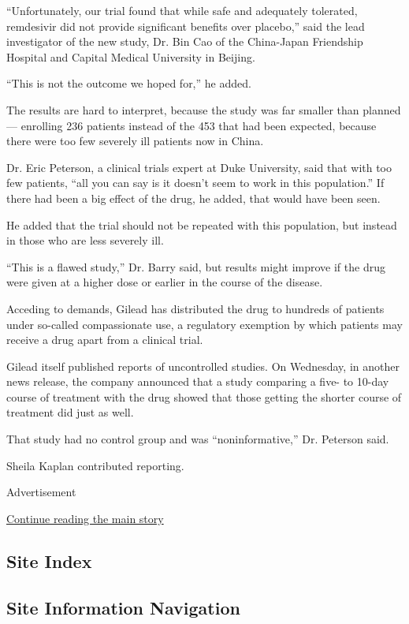 ``Unfortunately, our trial found that while safe and adequately
tolerated, remdesivir did not provide significant benefits over
placebo,'' said the lead investigator of the new study, Dr. Bin Cao of
the China-Japan Friendship Hospital and Capital Medical University in
Beijing.

``This is not the outcome we hoped for,'' he added.

The results are hard to interpret, because the study was far smaller
than planned --- enrolling 236 patients instead of the 453 that had been
expected, because there were too few severely ill patients now in China.

Dr. Eric Peterson, a clinical trials expert at Duke University, said
that with too few patients, ``all you can say is it doesn't seem to work
in this population.'' If there had been a big effect of the drug, he
added, that would have been seen.

He added that the trial should not be repeated with this population, but
instead in those who are less severely ill.

``This is a flawed study,'' Dr. Barry said, but results might improve if
the drug were given at a higher dose or earlier in the course of the
disease.

Acceding to demands, Gilead has distributed the drug to hundreds of
patients under so-called compassionate use, a regulatory exemption by
which patients may receive a drug apart from a clinical trial.

Gilead itself published reports of uncontrolled studies. On Wednesday,
in another news release, the company announced that a study comparing a
five- to 10-day course of treatment with the drug showed that those
getting the shorter course of treatment did just as well.

That study had no control group and was ``noninformative,'' Dr. Peterson
said.

Sheila Kaplan contributed reporting.

Advertisement

\protect\hyperlink{after-bottom}{Continue reading the main story}

\hypertarget{site-index}{%
\subsection{Site Index}\label{site-index}}

\hypertarget{site-information-navigation}{%
\subsection{Site Information
Navigation}\label{site-information-navigation}}

